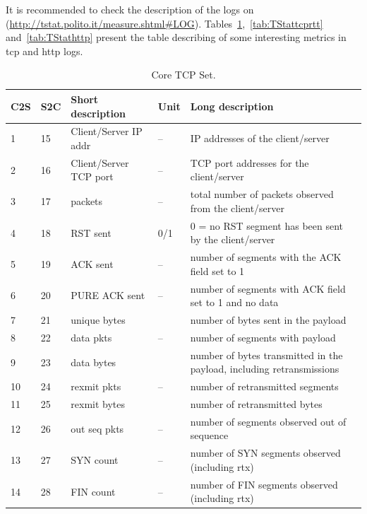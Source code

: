 \documentclass[a4paper,10pt]{article}
\newcommand{\TableFont}{\footnotesize}
\begin{document}
It is recommended to check the description of the logs on (\url{http://tstat.polito.it/measure.shtml#LOG}).  Tables~\ref{tab:TStattcp},~\ref{tab:TStattcprtt} and~\ref{tab:TStathttp}  present the table describing of some interesting metrics in tcp and http logs.
\begin{table}[tp]
	\caption{Core TCP Set.}\label{tab:TStattcp}
	\TableFont{
		\begin{center}
			\begin{tabular*}{1\textwidth}{|l|l|l|l|p{}}
				\toprule
				\cellcolor{BrightYellow}\textbf{C2S}		& \cellcolor{BrightYellow}\textbf{S2C} & \cellcolor{BrightYellow}\textbf{Short description} & \cellcolor{BrightYellow}\textbf{Unit}	& \cellcolor{BrightYellow}\textbf{Long description}\\ \midrule
				1	& 15	& Client/Server IP addr		& --	& IP addresses of the client/server\\ \hline
				2	& 16	& Client/Server TCP port	& --	& TCP port addresses for the client/server\\ \hline
				3	& 17	& packets					& --	& total number of packets observed from the client/server\\
				4	& 18	& RST sent					& 0/1	& 0 = no RST segment has been sent by the client/server\\
				5	& 19	& ACK sent					& --	& number of segments with the ACK field set to 1\\
				6	& 20	& PURE ACK sent				& --	& number of segments with ACK field set to 1 and no data\\ \hline
				7	& 21	& unique bytes				& \si{\byte}	& number of bytes sent in the payload\\ \hline
				8	& 22	& data pkts					& --	& number of segments with payload\\ \hline
				9	& 23	& data bytes				& \si{\byte}	& number of bytes transmitted in the payload, including retransmissions\\ \hline
				10	& 24	& rexmit pkts				& --	& number of retransmitted segments\\ \hline
				11	& 25	& rexmit bytes				& \si{\byte}	& number of retransmitted bytes\\ \hline
				12	& 26	& out seq pkts				& --	& number of segments observed out of sequence\\ \hline
				13	& 27	& SYN count					& --	& number of SYN segments observed (including rtx)\\ \hline
				14	& 28	& FIN count					& --	& number of FIN segments observed (including rtx)\\ \hline

\end{tabular*}
\end{center}}
\end{table}
\end{document}
